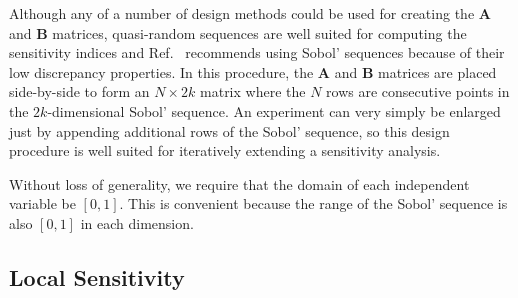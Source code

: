 \documentclass[12pt]{article}
\begin{document}
Although any of a number of design methods could be used for creating the $\mathbf{A}$ and $\mathbf{B}$ matrices, quasi-random sequences are well suited for computing the sensitivity indices and Ref.~\cite{saltelli_variance_2010} recommends using Sobol' sequences because of their low discrepancy properties. In this procedure, the $\mathbf{A}$ and $\mathbf{B}$ matrices are placed side-by-side to form an $N \times 2 k$ matrix where the $N$ rows are consecutive points in the $2 k$-dimensional Sobol' sequence. An experiment can very simply be enlarged just by appending additional rows of the Sobol' sequence, so this design procedure is well suited for iteratively extending a sensitivity analysis.

Without loss of generality, we require that the domain of each independent variable be $[0, 1]$. This is convenient because the range of the Sobol' sequence is also $[0, 1]$ in each dimension.


\subsection{Local Sensitivity}
\end{document}
